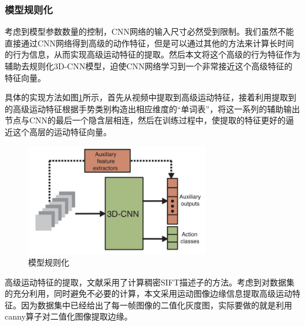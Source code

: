 \documentclass[a4paper, 12pt]{article}
\begin{document}
\subsubsection{模型规则化}
考虑到模型参数数量的控制，CNN网络的输入尺寸必然受到限制。我们虽然不能直接通过CNN网络得到高级的动作特征，但是可以通过其他的方法来计算长时间的行为信息，从而实现高级运动特征的提取。然后本文将这个高级的行为特征作为辅助去规则化3D-CNN模型，迫使CNN网络学习到一个非常接近这个高级特征的特征向量。

具体的实现方法如图\ref{fig:5}所示，首先从视频中提取到高级运动特征，接着利用提取到的高级运动特征根据手势类别构造出相应维度的“单词表”，将这一系列的辅助输出节点与CNN的最后一个隐含层相连，然后在训练过程中，使提取的特征更好的逼近这个高层的运动特征向量。

\begin{figure}[ht]
  \centering
  \includegraphics[width=8cm]{regular.png}
  \caption{\label{fig:5}模型规则化}
\end{figure}


高级运动特征的提取，文献\cite{p4}采用了计算稠密SIFT描述子的方法。考虑到对数据集的充分利用，同时避免不必要的计算，本文采用运动图像边缘信息提取高级运动特征。因为数据集中已经给出了每一帧图像的二值化灰度图，实际要做的就是利用canny算子对二值化图像提取边缘。
\end{document}
